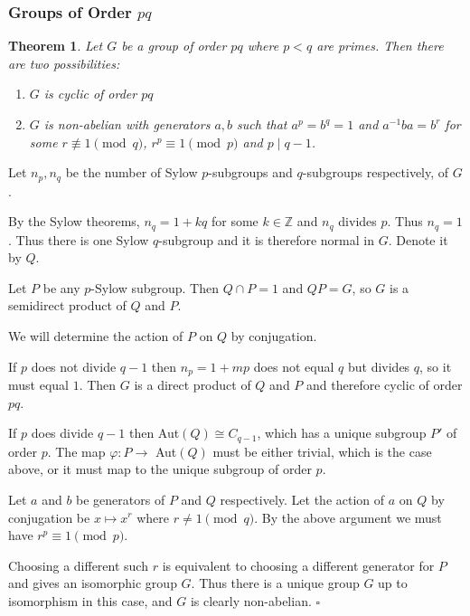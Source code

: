 \documentclass[10pt]{article}
\newcommand{\Z}{\mathbb{Z}}
\newtheorem{theorem}{Theorem}[section]
\newenvironment{proof}[1][Proof]{\begin{trivlist}
\item[\hskip \labelsep {\itshape #1}]}{\end{trivlist}}
\begin{document}
\subsubsection{Groups of Order $pq$}

\begin{theorem}
Let $G$ be a group of order $pq$ where $p < q$ are primes. Then there are two possibilities:
\begin{enumerate}
\item $G$ is cyclic of order $pq$
\item $G$ is non-abelian with generators $a, b$ such that $a^p = b^q = 1$ and $a^{-1}ba = b^r$ for some $r \not\equiv 1 \pmod{q}$, $r^p \equiv 1 \pmod{p}$ and $p \;|\; q - 1$.
\end{enumerate}
\end{theorem}

\begin{proof}
Let $n_p, n_q$ be the number of Sylow $p$-subgroups and $q$-subgroups respectively, of $G$.

By the Sylow theorems, $n_q = 1 + kq$ for some $k \in \Z$ and $n_q$ divides $p$. Thus $n_q = 1$. Thus there is one Sylow $q$-subgroup and it is therefore normal in $G$. Denote it by $Q$.

Let $P$ be any $p$-Sylow subgroup. Then $Q\cap P = 1$ and $QP = G$, so $G$ is a semidirect product of $Q$ and $P$.

We will determine the action of $P$ on $Q$ by conjugation.

If $p$ does not divide $q - 1$ then $n_p = 1 + mp$ does not equal $q$ but divides $q$, so it must equal $1$. Then $G$ is a direct product of $Q$ and $P$ and therefore cyclic of order $pq$.

If $p$ does divide $q - 1$ then Aut$(Q) \cong C_{q-1}$, which has a unique subgroup $P'$ of order $p$. The map $\varphi : P \to$ Aut$(Q)$ must be either trivial, which is the case above, or it must map to the unique subgroup of order $p$.

Let $a$ and $b$ be generators of $P$ and $Q$ respectively. Let the action of $a$ on $Q$ by conjugation be $x \mapsto x^r$ where $r \neq 1 \pmod{q}$. By the above argument we must have $r^p \equiv 1 \pmod{p}$.

Choosing a different such $r$ is equivalent to choosing a different generator for $P$ and gives an isomorphic group $G$. Thus there is a unique group $G$ up to isomorphism in this case, and $G$ is clearly non-abelian. $\square$
\end{proof}
\end{document}

